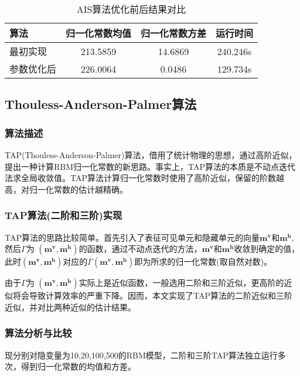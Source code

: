 \documentclass[11pt]{article}
\begin{document}
\begin{table}[!htbp]
  \centering  
  \begin{tabular}{lccc} 
  \hline
  算法 & 归一化常数均值 & 归一化常数方差 & 运行时间\\ \hline
  最初实现 & 213.5859 & 14.6869 & 240.246s\\      
  参数优化后 & 226.0064 & 0.0486 & 129.734s\\ \hline
\end{tabular}
\caption{AIS算法优化前后结果对比}
\label{AIS_Result}
\end{table}

\subsection{Thouless-Anderson-Palmer算法}
\subsubsection{算法描述}

TAP(Thouless-Anderson-Palmer)算法，借用了统计物理的思想，通过高阶近似，提出一种计算RBM归一化常数的新思路\cite{TAP}。事实上，TAP算法的本质是不动点迭代法求全局收敛值。TAP算法计算归一化常数时使用了高阶近似，保留的阶数越高，对归一化常数的估计越精确。

\subsubsection{TAP算法(二阶和三阶)实现}
TAP算法的思路比较简单。首先引入了表征可见单元和隐藏单元的向量$\mathbf{m}^{\mathbf{v}}$和$\mathbf{m}^{\mathbf{h}}$,然后$\Gamma$为
$(\mathbf{m}^{\mathbf{v}},\mathbf{m}^{\mathbf{h}})$的函数，通过不动点迭代的方法，$\mathbf{m}^{\mathbf{v}}$和$\mathbf{m}^{\mathbf{h}}$收敛到确定的值，此时$(\mathbf{m}^{\mathbf{v}},\mathbf{m}^{\mathbf{h}})$对应的$\Gamma(\mathbf{m}^{\mathbf{v}},\mathbf{m}^{\mathbf{h}})$即为所求的归一化常数(取自然对数)。

由于$\Gamma$为
$(\mathbf{m}^{\mathbf{v}},\mathbf{m}^{\mathbf{h}})$实际上是近似函数，一般选用二阶和三阶近似，更高阶的近似将会导致计算效率的严重下降。因而，本文实现了TAP算法的二阶近似和三阶近似，并对比两种近似的估计结果。

\subsubsection{算法分析与比较}
现分别对隐变量为10,20,100,500的RBM模型，二阶和三阶TAP算法独立运行多次，得到归一化常数的均值和方差。
\end{document}

